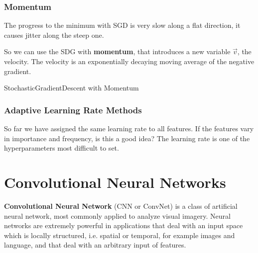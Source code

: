 \subsubsection{Momentum}
The progress to the minimum with SGD is very slow along a flat direction, it causes jitter along the steep one.

So we can use the SDG with \textbf{momentum}, that introduces a new variable \(\vec{v}\), the velocity. The velocity is an exponentially decaying moving average of the negative gradient.

\begin{algorithm}
    \caption{StochasticGradientDescent with Momentum}
    \label{alg:stochastic_gradient_descent_momentum}

    
\end{algorithm}

\subsubsection{Adaptive Learning Rate Methods}
So far we have assigned the same learning rate to all features. If the features vary in importance and frequency, is this a good idea? The learning rate is one of the hyperparameters most difficult to set.

\section{Convolutional Neural Networks}
\textbf{Convolutional Neural Network} (CNN or ConvNet) is a class of artificial neural network, most commonly applied to analyze visual imagery.  Neural networks are extremely powerful in applications that deal with an input space which is locally structured, i.e. spatial or temporal, for example images and language, and that deal with an arbitrary input of features.

